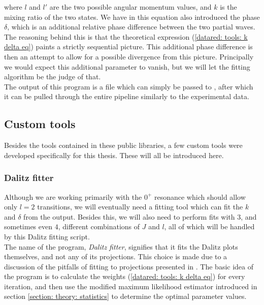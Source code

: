 where $l$ and $l'$ are the two possible angular momentum values, and $k$ is the mixing ratio of the two states. We have in this equation also introduced the phase $\delta$, which is an additional relative phase difference between the two partial waves. The reasoning behind this is that the theoretical expression (\ref{datared: tools: k delta eq}) paints a strictly sequential picture. This additional phase difference is then an attempt to allow for a possible divergence from this picture. Principally we would expect this additional parameter to vanish, but we will let the fitting algorithm be the judge of that. \\

The output of this program is a \ROOT{} file which can simply be passed to \simX{}, after which it can be pulled through the entire \AUSAlib{} pipeline similarly to the experimental data. 

\subsection{Custom tools} \label{sec: datared: custom tools}
Besides the tools contained in these public libraries, a few custom tools were developed specifically for this thesis. These will all be introduced here. 

\subsubsection{Dalitz fitter}
Although we are working primarily with the $0^+$ resonance which should allow only $l=2$ transitions, we will eventually need a fitting tool which can fit the $k$ and $\delta$ from the \simta{} output. Besides this, we will also need to perform fits with $3$, and sometimes even $4$, different combinations of $J$ and $l$, all of which will be handled by this Dalitz fitting script. \\

The name of the program, \textit{Dalitz fitter}, signifies that it fits the Dalitz plots themselves, and not any of its projections. This choice is made due to a discussion of the pitfalls of fitting to projections presented in \cite{Kuhlwein}. The basic idea of the program is to calculate the weights (\ref{datared: tools: k delta eq}) for every iteration, and then use the modified maximum likelihood estimator introduced in section \ref{section: theory: statistics} to determine the optimal parameter values. \\

